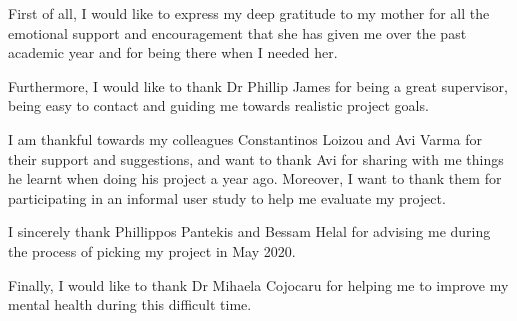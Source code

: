 \documentclass[11pt, a4paper, twoside, openany]{custard}
\begin{document}
	\begin{Acknowledgements}
		First of all, I would like to express my deep gratitude to my mother for all the emotional support and encouragement that she has given me over the past academic year and for being there when I needed her.
		
		Furthermore, I would like to thank Dr Phillip James for being a great supervisor, being easy to contact and guiding me towards realistic project goals.
		
		I am thankful towards my colleagues Constantinos Loizou and Avi Varma for their support and suggestions, and want to thank Avi for sharing with me things he learnt when doing his project a year ago. Moreover, I want to thank them for participating in an informal user study to help me evaluate my project.
		
		I sincerely thank Phillippos Pantekis and Bessam Helal for advising me during the process of picking my project in May 2020.
		
		Finally, I would like to thank Dr Mihaela Cojocaru for helping me to improve my mental health during this difficult time.
	\end{Acknowledgements}
	
	\tableofcontents*
	 
	
	 
	
	\mainmatter%

	
	
	
	
	
	\bibintoc%
	 
	
	\appendix
	\addappheadtotoc
	
	
\end{document}
